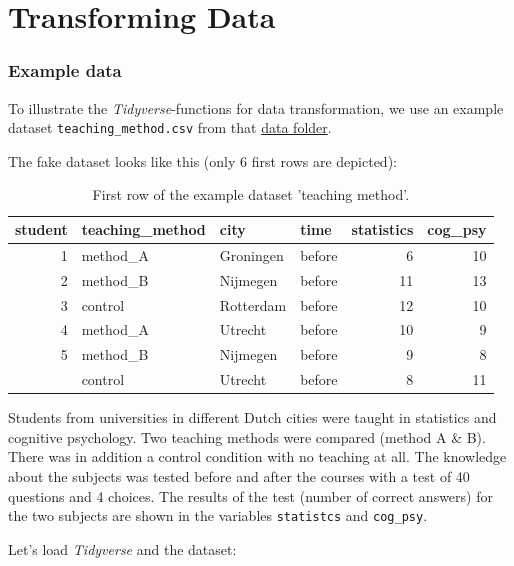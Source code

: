 \documentclass[
]{scrartcl}
\begin{document}
\hypertarget{transformingdata}{%
\section{Transforming Data}\label{transformingdata}}

\hypertarget{example-data}{%
\subsubsection*{Example data}\label{example-data}}

To illustrate the \emph{Tidyverse}-functions for data transformation, we use an example dataset \texttt{teaching\_method.csv} from that \href{./data}{data folder}.

The fake dataset looks like this (only 6 first rows are depicted):

\begin{table}

\caption{\label{tab:unnamed-chunk-148}First row of the example dataset 'teaching method'.}
\centering
\begin{tabular}[t]{rlllrr}
\toprule
student & teaching\_method & city & time & statistics & cog\_psy\\
\midrule
1 & method\_A & Groningen & before & 6 & 10\\
2 & method\_B & Nijmegen & before & 11 & 13\\
3 & control & Rotterdam & before & 12 & 10\\
4 & method\_A & Utrecht & before & 10 & 9\\
5 & method\_B & Nijmegen & before & 9 & 8\\
\addlinespace
6 & control & Utrecht & before & 8 & 11\\
\bottomrule
\end{tabular}
\end{table}

Students from universities in different Dutch cities were taught in statistics and cognitive psychology. Two teaching methods were compared (method A \& B). There was in addition a control condition with no teaching at all. The knowledge about the subjects was tested before and after the courses with a test of 40 questions and 4 choices. The results of the test (number of correct answers) for the two subjects are shown in the variables \texttt{statistcs} and \texttt{cog\_psy}.

Let's load \emph{Tidyverse} and the dataset:
\end{document}
